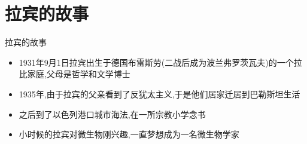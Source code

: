 \documentclass{beamer}
\begin{document}

\section{拉宾的故事}
\begin{frame}{拉宾的故事}
\begin{itemize}
\item<1-> 1931年9月1日拉宾出生于德国布雷斯劳(二战后成为波兰弗罗茨瓦夫)的一个拉比家庭,父母是哲学和文学博士
\item<3-> 1935年,由于拉宾的父亲看到了反犹太主义,于是他们居家迁居到巴勒斯坦生活
\item<5-> 之后到了以色列港口城市海法,在一所宗教小学念书
\item<6-> 小时候的拉宾对微生物刚兴趣,一直梦想成为一名微生物学家
\end{itemize}
\begin{figure}[htbp]
\end{figure}
\end{frame}
\end{document}
